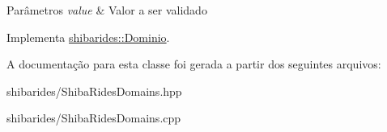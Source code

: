 \begin{DoxyParams}{Parâmetros}
{\em value} & Valor a ser validado \\
\hline
\end{DoxyParams}


Implementa \hyperlink{classshibarides_1_1Dominio_acc9445531455c072bbf708709aebbe55}{shibarides\+::\+Dominio}.



A documentação para esta classe foi gerada a partir dos seguintes arquivos\+:\begin{DoxyCompactItemize}
\item 
shibarides/Shiba\+Rides\+Domains.\+hpp\item 
shibarides/Shiba\+Rides\+Domains.\+cpp\end{DoxyCompactItemize}
